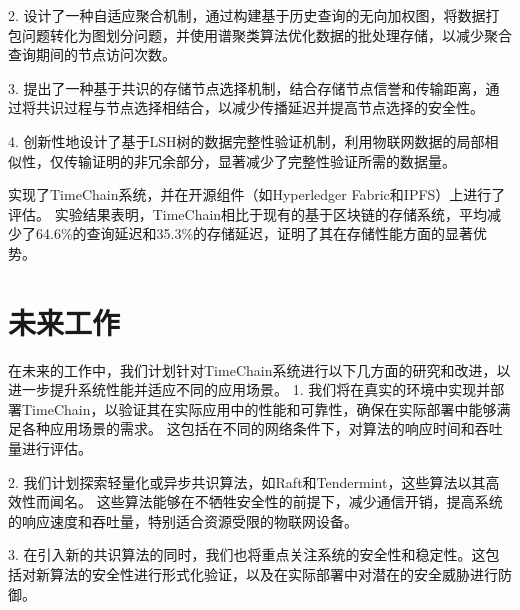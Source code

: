 2. 设计了一种自适应聚合机制，通过构建基于历史查询的无向加权图，将数据打包问题转化为图划分问题，并使用谱聚类算法优化数据的批处理存储，以减少聚合查询期间的节点访问次数。

3. 提出了一种基于共识的存储节点选择机制，结合存储节点信誉和传输距离，通过将共识过程与节点选择相结合，以减少传播延迟并提高节点选择的安全性。

4. 创新性地设计了基于LSH树的数据完整性验证机制，利用物联网数据的局部相似性，仅传输证明的非冗余部分，显著减少了完整性验证所需的数据量。

实现了TimeChain系统，并在开源组件（如Hyperledger Fabric和IPFS）上进行了评估。
实验结果表明，TimeChain相比于现有的基于区块链的存储系统，平均减少了64.6\%的查询延迟和35.3\%的存储延迟，证明了其在存储性能方面的显著优势。

\section{未来工作}
在未来的工作中，我们计划针对TimeChain系统进行以下几方面的研究和改进，以进一步提升系统性能并适应不同的应用场景。
1. 我们将在真实的环境中实现并部署TimeChain，以验证其在实际应用中的性能和可靠性，确保在实际部署中能够满足各种应用场景的需求。
这包括在不同的网络条件下，对算法的响应时间和吞吐量进行评估。

2. 我们计划探索轻量化或异步共识算法，如Raft和Tendermint，这些算法以其高效性而闻名。
这些算法能够在不牺牲安全性的前提下，减少通信开销，提高系统的响应速度和吞吐量，特别适合资源受限的物联网设备。

3. 在引入新的共识算法的同时，我们也将重点关注系统的安全性和稳定性。这包括对新算法的安全性进行形式化验证，以及在实际部署中对潜在的安全威胁进行防御。